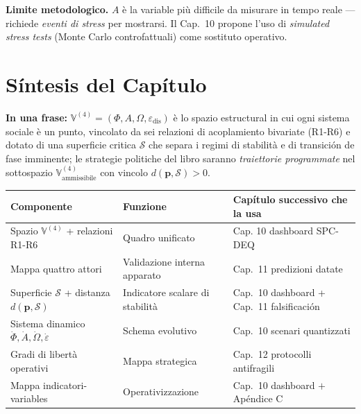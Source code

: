 \Conj{} \textbf{Limite metodologico.} \(A\) è la variable più difficile
da misurare in tempo reale --- richiede \emph{eventi di stress} per
mostrarsi. Il Cap.~10 propone l'uso di \emph{simulated stress tests}
(Monte Carlo controfattuali) come sostituto operativo.



\section{Síntesis del Capítulo}\label{sintesi-del-capítulo}

\Proved{} \textbf{In una frase:}
\(\mathbb{V}^{(4)} = (\Phi, A, \Omega, \varepsilon_{\text{dis}})\) è lo
spazio estructural in cui ogni sistema sociale è un punto, vincolato da
sei relazioni di acoplamiento bivariate (R1-R6) e dotato di una
superficie critica \(\mathcal{S}\) che separa i regimi di stabilità e di
transición de fase imminente; le strategie politiche del libro saranno
\emph{traiettorie programmate} nel sottospazio
\(\mathbb{V}^{(4)}_{\text{ammissibile}}\) con vincolo
\(d(\boldsymbol{p}, \mathcal{S}) > 0\).

{\def\LTcaptype{none} %
{\small\begin{longtable}[]{@{}
  >{\raggedright\arraybackslash}p{}
  >{\raggedright\arraybackslash}p{}
  >{\raggedright\arraybackslash}p{}@{}}
\toprule\noalign{}
\begin{minipage}[b]{\linewidth}\raggedright
Componente
\end{minipage} & \begin{minipage}[b]{\linewidth}\raggedright
Funzione
\end{minipage} & \begin{minipage}[b]{\linewidth}\raggedright
Capítulo successivo che la usa
\end{minipage} \\
\midrule\noalign{}
\endhead
\bottomrule\noalign{}
\endlastfoot
Spazio \(\mathbb{V}^{(4)}\) + relazioni R1-R6 & Quadro unificato & Cap.
10 dashboard SPC-DEQ \\
Mappa quattro attori & Validazione interna apparato & Cap.~11 predizioni
datate \\
Superficie \(\mathcal{S}\) + distanza \(d(\boldsymbol{p}, \mathcal{S})\)
& Indicatore scalare di stabilità & Cap.~10 dashboard + Cap.~11
falsificación \\
Sistema dinamico \(\dot\Phi, \dot A, \dot\Omega, \dot\varepsilon\) &
Schema evolutivo & Cap.~10 scenari quantizzati \\
Gradi di libertà operativi & Mappa strategica & Cap.~12 protocolli
antifragili \\
Mappa indicatori-variables & Operativizzazione & Cap.~10 dashboard \(+\)
Apéndice C \\
\end{longtable}}
}

